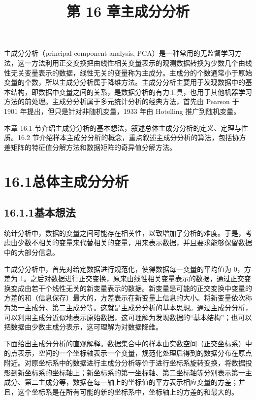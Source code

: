 \documentclass[UTF8,12pt,a4paper,fontset=fandol]{ctexart}
\title{第 16 章\quad 主成分分析}
\author{}
\date{}
\begin{document}
\maketitle

主成分分析（principal component analysis, PCA）是一种常用的无监督学习方法，这一方法利用正交变换把由线性相关变量表示的观测数据转换为少数几个由线性无关变量表示的数据，线性无关的变量称为主成分。主成分的个数通常小于原始变量的个数，所以主成分分析属于降维方法。主成分分析主要用于发现数据中的基本结构，即数据中变量之间的关系，是数据分析的有力工具，也用于其他机器学习方法的前处理。主成分分析属于多元统计分析的经典方法，首先由 Pearson 于 1901 年提出，但只是针对非随机变量，1933 年由 Hotelling 推广到随机变量。

本章 16.1 节介绍主成分分析的基本想法，叙述总体主成分分析的定义、定理与性质。16.2 节介绍样本主成分分析的概念，重点叙述主成分分析的算法，包括协方差矩阵的特征值分解方法和数据矩阵的奇异值分解方法。

\section*{16.1\quad 总体主成分分析}

\subsection*{16.1.1\quad 基本想法}

统计分析中，数据的变量之间可能存在相关性，以致增加了分析的难度。于是，考虑由少数不相关的变量来代替相关的变量，用来表示数据，并且要求能够保留数据中的大部分信息。

主成分分析中，首先对给定数据进行规范化，使得数据每一变量的平均值为 0，方差为 1。之后对数据进行正交变换，原来由线性相关变量表示的数据，通过正交变换变成由若干个线性无关的新变量表示的数据。新变量是可能的正交变换中变量的方差的和（信息保存）最大的，方差表示在新变量上信息的大小。将新变量依次称为第一主成分、第二主成分等。这就是主成分分析的基本思想。通过主成分分析，可以利用主成分近似地表示原始数据，这可理解为发现数据的“基本结构”；也可以把数据由少数主成分表示，这可理解为对数据降维。

下面给出主成分分析的直观解释。数据集合中的样本由实数空间（正交坐标系）中的点表示，空间的一个坐标轴表示一个变量，规范化处理后得到的数据分布在原点附近。对原坐标系中的数据进行主成分分析等价于进行坐标系旋转变换，将数据投影到新坐标系的坐标轴上；新坐标系的第一坐标轴、第二坐标轴等分别表示第一主成分、第二主成分等，数据在每一轴上的坐标值的平方表示相应变量的方差；并且，这个坐标系是在所有可能的新的坐标系中，坐标轴上的方差的和最大的。
\end{document}
